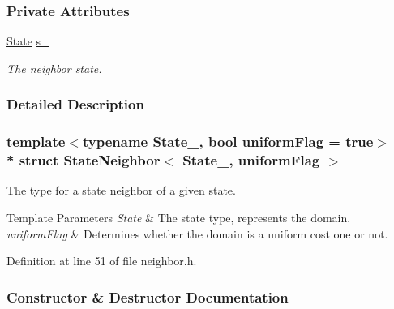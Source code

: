 \subsubsection*{Private Attributes}
\begin{DoxyCompactItemize}
\item 
\hyperlink{structCost_a35c84b427ff64f117a9393e8d46b0f85}{State} \hyperlink{structStateNeighbor_a33c20280642a0dad1f332cc98181787e}{s\+\_\+}\hypertarget{structStateNeighbor_a33c20280642a0dad1f332cc98181787e}{}\label{structStateNeighbor_a33c20280642a0dad1f332cc98181787e}

\begin{DoxyCompactList}\small\item\em The neighbor state. \end{DoxyCompactList}\end{DoxyCompactItemize}


\subsubsection{Detailed Description}
\subsubsection*{template$<$typename State\+\_\+, bool uniform\+Flag = true$>$\\*
struct State\+Neighbor$<$ State\+\_\+, uniform\+Flag $>$}

The type for a state neighbor of a given state. 


\begin{DoxyTemplParams}{Template Parameters}
{\em State} & The state type, represents the domain. \\
\hline
{\em uniform\+Flag} & Determines whether the domain is a uniform cost one or not. \\
\hline
\end{DoxyTemplParams}


Definition at line 51 of file neighbor.\+h.



\subsubsection{Constructor \& Destructor Documentation}
